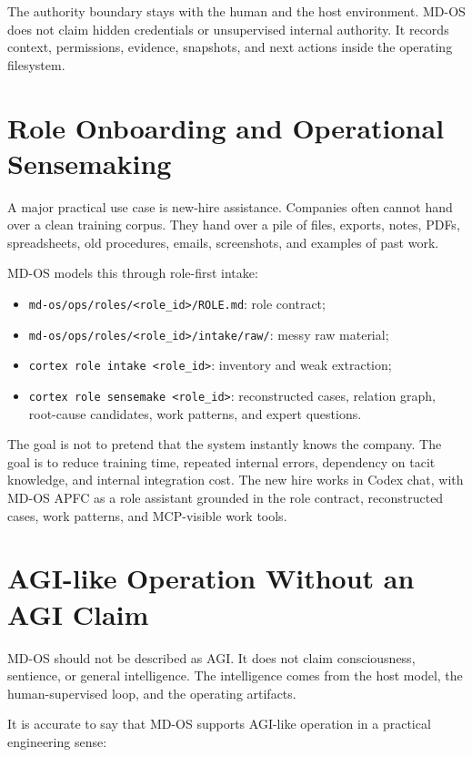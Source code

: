 \documentclass[11pt,a4paper]{article}
\newcommand{\code}[1]{\texttt{#1}}
\begin{document}
The authority boundary stays with the human and the host environment. MD-OS
does not claim hidden credentials or unsupervised internal authority. It
records context, permissions, evidence, snapshots, and next actions inside the
operating filesystem.

\section{Role Onboarding and Operational Sensemaking}

A major practical use case is new-hire assistance. Companies often cannot hand
over a clean training corpus. They hand over a pile of files, exports, notes,
PDFs, spreadsheets, old procedures, emails, screenshots, and examples of past
work.

MD-OS models this through role-first intake:

\begin{itemize}
  \item \code{md-os/ops/roles/<role\_id>/ROLE.md}: role contract;
  \item \code{md-os/ops/roles/<role\_id>/intake/raw/}: messy raw material;
  \item \code{cortex role intake <role\_id>}: inventory and weak extraction;
  \item \code{cortex role sensemake <role\_id>}: reconstructed cases, relation
  graph, root-cause candidates, work patterns, and expert questions.
\end{itemize}

The goal is not to pretend that the system instantly knows the company. The
goal is to reduce training time, repeated internal errors, dependency on tacit
knowledge, and internal integration cost. The new hire works in Codex chat,
with MD-OS APFC as a role assistant grounded in the role contract, reconstructed
cases, work patterns, and MCP-visible work tools.

\section{AGI-like Operation Without an AGI Claim}

MD-OS should not be described as AGI. It does not claim consciousness,
sentience, or general intelligence. The intelligence comes from the host model,
the human-supervised loop, and the operating artifacts.

It is accurate to say that MD-OS supports AGI-like operation in a practical
engineering sense:
\end{document}
